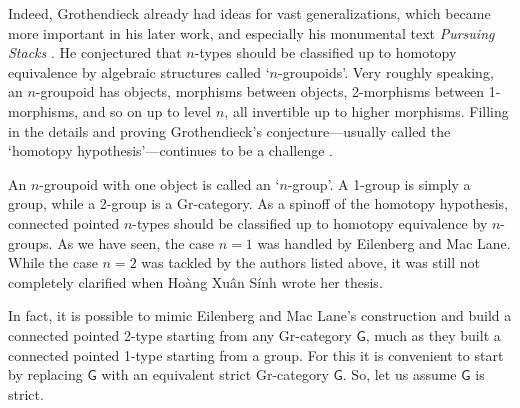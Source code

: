\documentclass[reqno,12pt]{amsart}
\newcommand{\G}{{\mathsf{G}}}   %
\theoremstyle{definition}
\begin{document}
Indeed, Grothendieck already had ideas for vast generalizations, which became more important in his later work, and especially his monumental text
\textsl{Pursuing Stacks} \cite{G84}.  He conjectured that $n$-types should be classified up to homotopy equivalence by algebraic structures called `$n$-groupoids'.  Very roughly speaking, an $n$-groupoid has objects, morphisms between objects, 2-morphisms between 1-morphisms, and so on up to level $n$, all invertible up to higher morphisms.   Filling in the details and proving Grothendieck's conjecture---usually called the `homotopy hypothesis'---continues to be a challenge \cite{HL19}.

An $n$-groupoid with one object is called an `$n$-group'.   A 1-group is simply a group, while a 2-group is a Gr-category.  As a spinoff of the homotopy hypothesis, connected pointed $n$-types should be classified up to homotopy equivalence by $n$-groups.   As we have seen, the case $n = 1$ was handled by Eilenberg and Mac Lane.  While the case $n = 2$ was tackled by the authors listed above, it was still not completely clarified when Ho\`ang Xu\^an S\'inh wrote her thesis.  

In fact, it is possible to mimic Eilenberg and Mac Lane's construction and build a connected pointed 2-type starting from any Gr-category $\G$, much as they built a connected pointed 1-type starting from a group.  For this it is convenient to start by replacing $\G$ with an equivalent strict Gr-category $\G$.   So, let us assume $\G$ is strict.  
\end{document}
